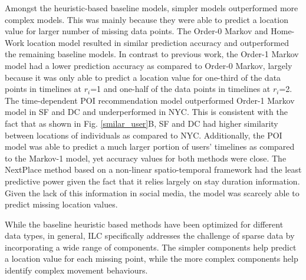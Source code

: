 Amongst the heuristic-based baseline models, simpler models outperformed more complex models. This was mainly because they were able to predict a location value for larger number of missing data points. The Order-0 Markov and Home-Work location model resulted in similar prediction accuracy and outperformed the remaining baseline models. 
In contrast to previous work, the Order-1 Markov model had a lower prediction accuracy as compared to Order-0 Markov, largely because it was only able to predict a location value for one-third of the data points in timelines at $r_i$=1 and one-half of the data points in timelines at $r_i$=2. The time-dependent POI recommendation model outperformed Order-1 Markov model in SF and DC and underperformed in NYC. This is consistent with the fact that as shown in Fig. \ref{smilar_user}B, SF and DC had higher similarity between locations of individuals as compared to NYC. Additionally, the POI model was able to predict a much larger portion of users' timelines as compared to the Markov-1 model, yet accuracy values for both methods were close. The NextPlace method based on a non-linear spatio-temporal framework had the least predictive power given the fact that it relies largely on stay duration information. Given the lack of this information in social media, the model was scarcely able to predict missing location values.


While the baseline heuristic based methods have been optimized for different data types, in general, ILC specifically addresses the challenge of sparse data by incorporating a wide range of components. The simpler components help predict a location value for each missing point, while the more complex components help identify complex movement behaviours. 



